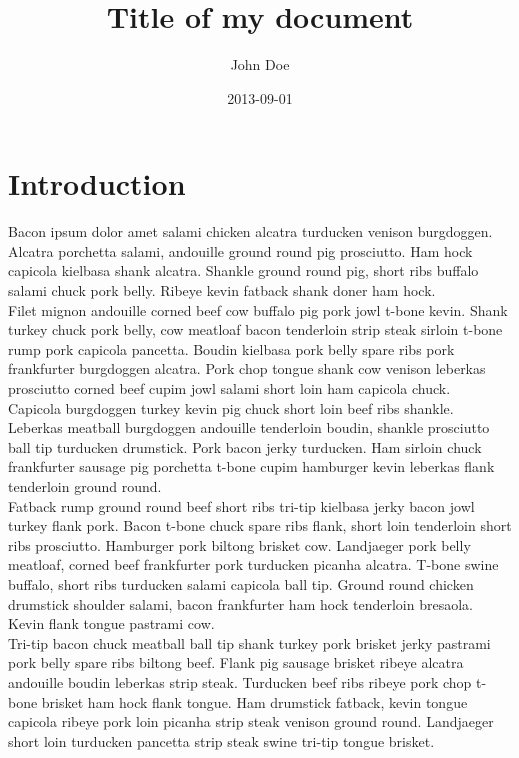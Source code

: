\documentclass{article}
\title{Title of my document}
\date{2013-09-01}
\author{John Doe}
\begin{document}
\maketitle
{}
\newpage
{}



\doublespacing
\tableofcontents
\singlespacing

\newpage

\section{Introduction}

Bacon ipsum dolor amet salami \cite{DUMMY:1} chicken alcatra turducken venison burgdoggen. Alcatra porchetta salami, andouille ground round pig prosciutto. Ham hock capicola kielbasa shank alcatra. Shankle ground round pig, short ribs buffalo salami chuck pork belly. Ribeye kevin fatback shank doner ham hock.
\\

Filet mignon andouille corned beef cow buffalo pig pork jowl t-bone kevin. Shank turkey chuck pork belly, cow meatloaf bacon tenderloin strip steak sirloin t-bone rump pork capicola pancetta. Boudin kielbasa pork belly spare ribs pork frankfurter burgdoggen alcatra. Pork chop tongue shank cow venison leberkas prosciutto corned beef cupim jowl salami short loin ham capicola chuck.
\\

Capicola burgdoggen turkey kevin pig chuck short loin beef ribs shankle. Leberkas meatball burgdoggen andouille tenderloin boudin, shankle prosciutto ball tip turducken drumstick. Pork bacon jerky turducken. Ham sirloin chuck frankfurter sausage pig porchetta t-bone cupim hamburger kevin leberkas flank tenderloin ground round.
\\

Fatback rump ground round beef short ribs tri-tip kielbasa jerky bacon jowl turkey flank pork. Bacon t-bone chuck spare ribs flank, short loin tenderloin short ribs prosciutto. Hamburger pork biltong brisket cow. Landjaeger pork belly meatloaf, corned beef frankfurter pork turducken picanha alcatra. T-bone swine buffalo, short ribs turducken salami capicola ball tip. Ground round chicken drumstick shoulder salami, bacon frankfurter ham hock tenderloin bresaola. Kevin flank tongue pastrami cow.
\\

Tri-tip bacon chuck meatball ball tip shank turkey pork brisket jerky pastrami pork belly spare ribs biltong beef. Flank pig sausage brisket ribeye alcatra andouille boudin leberkas strip steak. Turducken beef ribs ribeye pork chop t-bone brisket ham hock flank tongue. Ham drumstick fatback, kevin tongue capicola ribeye pork loin picanha strip steak venison ground round. Landjaeger short loin turducken pancetta strip steak swine tri-tip tongue brisket.
\\
\end{document}
